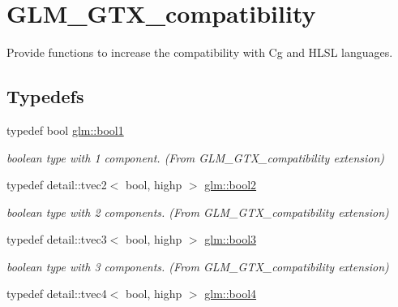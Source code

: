 \hypertarget{group__gtx__compatibility}{}\section{G\+L\+M\+\_\+\+G\+T\+X\+\_\+compatibility}
\label{group__gtx__compatibility}


Provide functions to increase the compatibility with Cg and H\+L\+SL languages.  


\subsection*{Typedefs}
\begin{DoxyCompactItemize}
\item 
typedef bool \hyperlink{group__gtx__compatibility_gab65f19f5170f95a2f06d6aa6482c9405}{glm\+::bool1}\hypertarget{group__gtx__compatibility_gab65f19f5170f95a2f06d6aa6482c9405}{}\label{group__gtx__compatibility_gab65f19f5170f95a2f06d6aa6482c9405}

\begin{DoxyCompactList}\small\item\em boolean type with 1 component. (From G\+L\+M\+\_\+\+G\+T\+X\+\_\+compatibility extension) \end{DoxyCompactList}\item 
typedef detail\+::tvec2$<$ bool, highp $>$ \hyperlink{group__gtx__compatibility_gafede6e8549e9bb9da63f404022298d40}{glm\+::bool2}\hypertarget{group__gtx__compatibility_gafede6e8549e9bb9da63f404022298d40}{}\label{group__gtx__compatibility_gafede6e8549e9bb9da63f404022298d40}

\begin{DoxyCompactList}\small\item\em boolean type with 2 components. (From G\+L\+M\+\_\+\+G\+T\+X\+\_\+compatibility extension) \end{DoxyCompactList}\item 
typedef detail\+::tvec3$<$ bool, highp $>$ \hyperlink{group__gtx__compatibility_gad18ebb149851844fd704e138c4af9a44}{glm\+::bool3}\hypertarget{group__gtx__compatibility_gad18ebb149851844fd704e138c4af9a44}{}\label{group__gtx__compatibility_gad18ebb149851844fd704e138c4af9a44}

\begin{DoxyCompactList}\small\item\em boolean type with 3 components. (From G\+L\+M\+\_\+\+G\+T\+X\+\_\+compatibility extension) \end{DoxyCompactList}\item 
typedef detail\+::tvec4$<$ bool, highp $>$ \hyperlink{group__gtx__compatibility_ga6ef1f104d22f384c4d59f2b1ca1768a7}{glm\+::bool4}\hypertarget{group__gtx__compatibility_ga6ef1f104d22f384c4d59f2b1ca1768a7}{}\label{group__gtx__compatibility_ga6ef1f104d22f384c4d59f2b1ca1768a7}


\end{DoxyCompactItemize}
